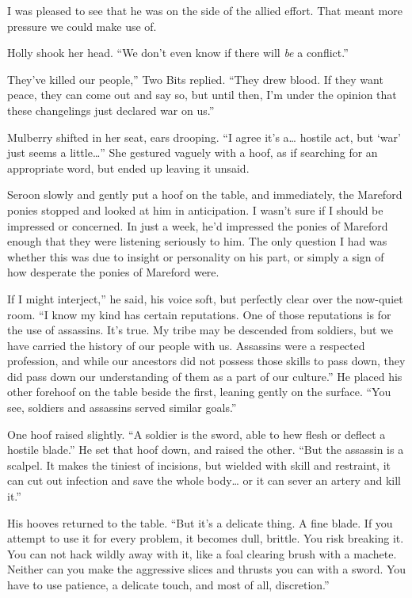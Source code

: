 I was pleased to see that he was on the side of the allied effort. That meant more pressure we could make use of.

Holly shook her head. “We don’t even know if there will \textit{be} a conflict.”

\leavevmode{}They’ve killed our people,” Two Bits replied. “They drew blood. If they want peace, they can come out and say so, but until then, I’m under the opinion that these changelings just declared war on us.”

Mulberry shifted in her seat, ears drooping. “I agree it’s a… hostile act, but ‘war’ just seems a little…” She gestured vaguely with a hoof, as if searching for an appropriate word, but ended up leaving it unsaid.

Seroon slowly and gently put a hoof on the table, and immediately, the Mareford ponies stopped and looked at him in anticipation. I wasn’t sure if I should be impressed or concerned. In just a week, he’d impressed the ponies of Mareford enough that they were listening seriously to him. The only question I had was whether this was due to insight or personality on his part, or simply a sign of how desperate the ponies of Mareford were.

\leavevmode{}If I might interject,” he said, his voice soft, but perfectly clear over the now-quiet room. “I know my kind has certain reputations. One of those reputations is for the use of assassins. It’s true. My tribe may be descended from soldiers, but we have carried the history of our people with us. Assassins were a respected profession, and while our ancestors did not possess those skills to pass down, they did pass down our understanding of them as a part of our culture.” He placed his other forehoof on the table beside the first, leaning gently on the surface. “You see, soldiers and assassins served similar goals.”

One hoof raised slightly. “A soldier is the sword, able to hew flesh or deflect a hostile blade.” He set that hoof down, and raised the other. “But the assassin is a scalpel. It makes the tiniest of incisions, but wielded with skill and restraint, it can cut out infection and save the whole body… or it can sever an artery and kill it.”

His hooves returned to the table. “But it’s a delicate thing. A fine blade. If you attempt to use it for every problem, it becomes dull, brittle. You risk breaking it. You can not hack wildly away with it, like a foal clearing brush with a machete. Neither can you make the aggressive slices and thrusts you can with a sword. You have to use patience, a delicate touch, and most of all, discretion.”

